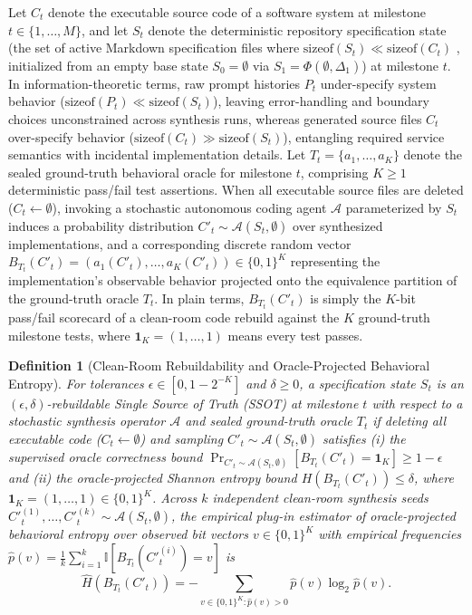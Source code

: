 \documentclass[11pt,a4paper,copyright]{google}
\newtheorem{definition}{Definition}
\begin{document}
Let $C_t$ denote the executable source code of a software system at milestone $t \in \{1, \dots, M\}$, and let $S_t$ denote the deterministic repository specification state (the set of active Markdown specification files where $\mathrm{sizeof}(S_t) \ll \mathrm{sizeof}(C_t)$ \cite{rensin2026elephant,calderon2026empty,storey2026intent}, initialized from an empty base state $S_0 = \emptyset$ via $S_1 = \Phi(\emptyset, \Delta_1)$) at milestone $t$. In information-theoretic terms, raw prompt histories $P_t$ under-specify system behavior ($\mathrm{sizeof}(P_t) \ll \mathrm{sizeof}(S_t)$), leaving error-handling and boundary choices unconstrained across synthesis runs, whereas generated source files $C_t$ over-specify behavior ($\mathrm{sizeof}(C_t) \gg \mathrm{sizeof}(S_t)$), entangling required service semantics with incidental implementation details. Let $T_t = \{a_1, \dots, a_K\}$ denote the sealed ground-truth behavioral oracle for milestone $t$, comprising $K \ge 1$ deterministic pass/fail test assertions. When all executable source files are deleted ($C_t \leftarrow \emptyset$), invoking a stochastic autonomous coding agent $\mathcal{A}$ parameterized by $S_t$ induces a probability distribution $C'_t \sim \mathcal{A}(S_t, \emptyset)$ over synthesized implementations, and a corresponding discrete random vector $B_{T_t}(C'_t) = (a_1(C'_t), \dots, a_K(C'_t)) \in \{0,1\}^K$ representing the implementation's observable behavior projected onto the equivalence partition of the ground-truth oracle $T_t$. In plain terms, $B_{T_t}(C'_t)$ is simply the $K$-bit pass/fail scorecard of a clean-room code rebuild against the $K$ ground-truth milestone tests, where $\mathbf{1}_K = (1, \dots, 1)$ means every test passes.

\begin{definition}[Clean-Room Rebuildability and Oracle-Projected Behavioral Entropy]
For tolerances $\epsilon \in [0, 1 - 2^{-K}]$ and $\delta \ge 0$, a specification state $S_t$ is an $(\epsilon, \delta)$-rebuildable Single Source of Truth (SSOT) at milestone $t$ with respect to a stochastic synthesis operator $\mathcal{A}$ and sealed ground-truth oracle $T_t$ if deleting all executable code ($C_t \leftarrow \emptyset$) and sampling $C'_t \sim \mathcal{A}(S_t, \emptyset)$ satisfies (i) the supervised oracle correctness bound $\Pr_{C'_t \sim \mathcal{A}(S_t, \emptyset)}[B_{T_t}(C'_t) = \mathbf{1}_K] \ge 1 - \epsilon$ and (ii) the oracle-projected Shannon entropy bound $H(B_{T_t}(C'_t)) \le \delta$, where $\mathbf{1}_K = (1, \dots, 1) \in \{0,1\}^K$. Across $k$ independent clean-room synthesis seeds $C'^{(1)}_t, \dots, C'^{(k)}_t \sim \mathcal{A}(S_t, \emptyset)$, the empirical plug-in estimator of oracle-projected behavioral entropy over observed bit vectors $v \in \{0,1\}^K$ with empirical frequencies $\hat{p}(v) = \frac{1}{k}\sum_{i=1}^k \mathbb{I}[B_{T_t}(C'^{(i)}_t) = v]$ is
\[
\hat{H}(B_{T_t}(C'_t)) = -\sum_{v \in \{0,1\}^K : \hat{p}(v) > 0} \hat{p}(v) \log_2 \hat{p}(v).
\]
\end{definition}
\end{document}
